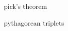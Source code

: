 \documentclass[a4paper,11pt]{article}
\begin{document}
pick's theorem

pythagorean triplets
\end{document}
